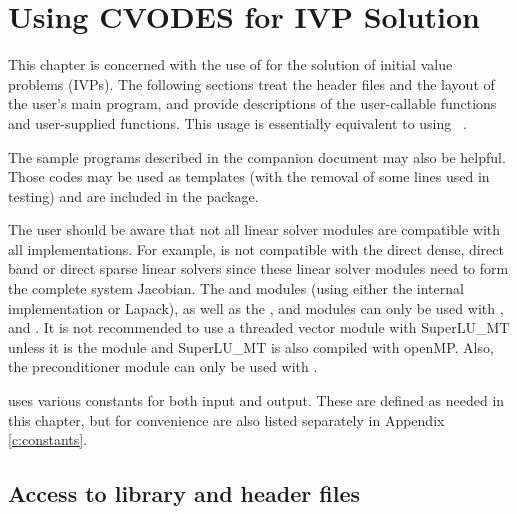 \chapter{Using CVODES for IVP Solution}\label{s:simulation}

This chapter is concerned with the use of {\cvodes} for the solution of
initial value problems (IVPs).  The following
sections treat the header files and the layout of the user's main
program, and provide descriptions of the {\cvodes} user-callable
functions and user-supplied functions.
This usage is essentially equivalent to using {\cvode}~\cite{cvode_ug}.

The sample programs described in the companion document \cite{cvodes_ex} 
may also be helpful.  Those codes may be used as templates (with the removal
of some lines used in testing) and are included in the {\cvodes} package.

The user should be aware that not all linear solver modules are compatible 
with all {\nvector} implementations. 
For example, {\nvecp} is not compatible with the direct dense, direct
band or direct sparse linear solvers since these linear solver modules
need to form the complete system Jacobian.  The {\cvdense}
and {\cvband} modules (using either the internal implementation or
Lapack), as well as the {\cvklu}, {\cvsuperlumt} and {\cvbandpre}
modules can only be used with {\nvecs}, {\nvecopenmp} and {\nvecpthreads}. 
It is not recommended to use a threaded vector module with SuperLU\_MT
unless it is the {\nvecopenmp} module and SuperLU\_MT is also compiled
with openMP.
Also, the preconditioner module {\cvbbdpre} can only be used with {\nvecp}.  

{\cvodes} uses various constants for both input and output.  These are
defined as needed in this chapter, but for convenience are also listed
separately in Appendix \ref{c:constants}.

\section{Access to library and header files}\label{ss:file_access}

